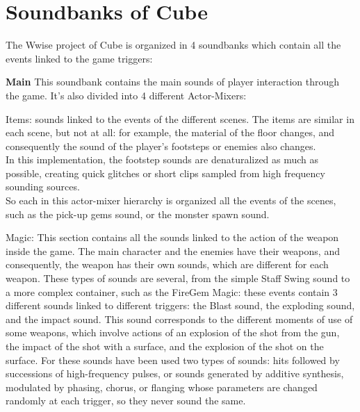 \section{Soundbanks of Cube}
The Wwise project of Cube is organized in 4 soundbanks which contain all the events linked to the game triggers:

	\begin{compactitem}
		\item \textbf{Main} This soundbank contains the main sounds of player interaction through the game. It's also divided into 4 different Actor-Mixers:
			\begin{compactitem}
				\item Items: sounds linked to the events of the different scenes. The items are similar in each scene, but not at all: for example, the material of the floor changes, and consequently the sound of the player's footsteps or enemies also changes. \\
				In this implementation, the footstep sounds are denaturalized as much as possible, creating quick glitches or short clips sampled from high frequency sounding sources. \\
				So each in this actor-mixer hierarchy is organized all the events of the scenes, such as the pick-up gems sound, or the monster spawn sound.

				\item Magic: This section contains all the sounds linked to the action of the weapon inside the game. The main character and the enemies have their weapons, and consequently, the weapon has their own sounds, which are different for each weapon. These types of sounds are several, from the simple Staff Swing sound to a more complex container, such as the FireGem Magic: these events contain 3 different sounds linked to different triggers: the Blast sound, the exploding sound, and the impact sound. This sound corresponds to the different moments of use of some weapons, which involve actions of an explosion of the shot from the gun, the impact of the shot with a surface, and the explosion of the shot on the surface.
				For these sounds have been used two types of sounds: hits followed by successions of high-frequency pulses, or sounds generated by additive synthesis, modulated by phasing, chorus, or flanging whose parameters are changed randomly at each trigger, so they never sound the same.


\end{compactitem}
\end{compactitem}
